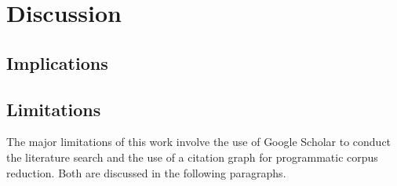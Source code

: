 \documentclass[manuscript,screen,review]{acmart}
\begin{document}




\section{Discussion} \label{sec:discussion}


\subsection{Implications}


\subsection{Limitations}
The major limitations of this work involve the use of Google Scholar to conduct the literature search and the use of a citation graph for programmatic corpus reduction. Both are discussed in the following paragraphs.
\end{document}
